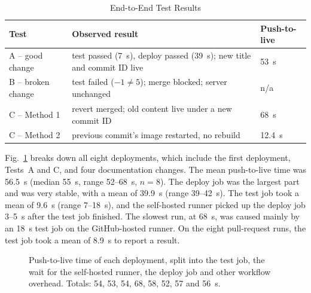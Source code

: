 \documentclass[conference]{IEEEtran}
\begin{document}
\begin{table}[t]
\caption{End-to-End Test Results}
\label{tab:results}
\centering
\footnotesize
\begin{tabular}{@{}L{1.45cm}L{4.1cm}L{1.6cm}@{}}
\toprule
\textbf{Test} & \textbf{Observed result} & \textbf{Push-to-live}\\
\midrule
A -- good change & test passed (7~s), deploy passed (39~s); new title and commit ID live & 53~s\\
B -- broken change & test failed ($-1 \neq 5$); merge blocked; server unchanged & n/a\\
C -- Method 1 & revert merged; old content live under a new commit ID & 68~s\\
C -- Method 2 & previous commit's image restarted, no rebuild & 12.4~s\\
\bottomrule
\end{tabular}
\end{table}

Fig.~\ref{fig:times} breaks down all eight deployments, which include the first deployment, Tests~A and C, and four documentation changes. The mean push-to-live time was 56.5~s (median 55~s, range 52--68~s, $n = 8$). The deploy job was the largest part and was very stable, with a mean of 39.9~s (range 39--42~s). The test job took a mean of 9.6~s (range 7--18~s), and the self-hosted runner picked up the deploy job 3--5~s after the test job finished. The slowest run, at 68~s, was caused mainly by an 18~s test job on the GitHub-hosted runner. On the eight pull-request runs, the test job took a mean of 8.9~s to report a result.

\begin{figure}[t]
\centering
{}
\caption{Push-to-live time of each deployment, split into the test job, the wait for the self-hosted runner, the deploy job and other workflow overhead. Totals: 54, 53, 54, 68, 58, 52, 57 and 56~s.}
\label{fig:times}
\end{figure}
\end{document}
